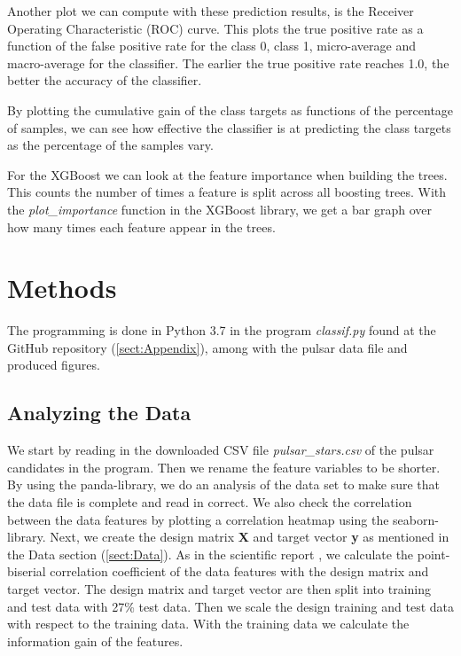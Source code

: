 \documentclass[12pt,a4paper,english]{article}
\begin{document}
Another plot we can compute with these prediction results, is the Receiver Operating Characteristic (ROC) curve. This plots the true positive rate as a function of the false positive rate for the class 0, class 1, micro-average and macro-average for the classifier. The earlier the true positive rate reaches 1.0, the better the accuracy of the classifier.

By plotting the cumulative gain of the class targets as functions of the percentage of samples, we can see how effective the classifier is at predicting the class targets as the percentage of the samples vary.

For the XGBoost we can look at the feature importance when building the trees. This counts the number of times a feature is split across all boosting trees. With the \textit{plot\_importance} function in the XGBoost library, we get a bar graph over how many times each feature appear in the trees.


\section{Methods}
\label{sect:Methods}
The programming is done in Python 3.7 in the program \textit{classif.py} found at the GitHub repository (\ref{sect:Appendix}), among with the pulsar data file and produced figures.

\subsection{Analyzing the Data}
\label{subsect:analysis}
We start by reading in the downloaded CSV file \textit{pulsar\_stars.csv} of the pulsar candidates in the program. Then we rename the feature variables to be shorter. By using the panda-library, we do an analysis of the data set to make sure that the data file is complete and read in correct. We also check the correlation between the data features by plotting a correlation heatmap using the seaborn-library. Next, we create the design matrix \textbf{X} and target vector \textbf{y} as mentioned in the Data section (\ref{sect:Data}). As in the scientific report \cite{pulsar_art}, we calculate the point-biserial correlation coefficient of the data features with the design matrix and target vector. The design matrix and target vector are then split into training and test data with 27\% test data. Then we scale the design training and test data with respect to the training data. With the training data we calculate the information gain of the features.
\end{document}
